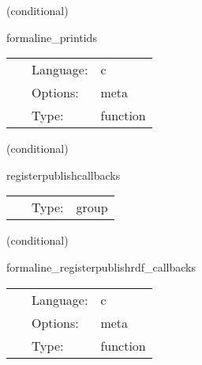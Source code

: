 \vspace{5mm}

   (conditional) 

\hspace{5mm} formaline\_printids 

\hspace{5mm}{\it print the build and simulation ids } 


\hspace{5mm}

 \begin{tabular*}{160mm}{cll} 
~ & Language:  & c \\ 
~ & Options:  & meta \\ 
~ & Type:  & function \\ 
\end{tabular*} 


\vspace{5mm}

\noindent {\bf }   (conditional) 

\hspace{5mm} registerpublishcallbacks 

\hspace{5mm}{\it tell cactus that this group exists, but is not scheduled from here } 


\hspace{5mm}

 \begin{tabular*}{160mm}{cll} 
~ & Type:  & group \\ 
\end{tabular*} 


\vspace{5mm}

   (conditional) 

\hspace{5mm} formaline\_registerpublishrdf\_callbacks 

\hspace{5mm}{\it register rdf callbacks for the publish api } 


\hspace{5mm}

 \begin{tabular*}{160mm}{cll} 
~ & Language:  & c \\ 
~ & Options:  & meta \\ 
~ & Type:  & function \\ 
\end{tabular*} 


